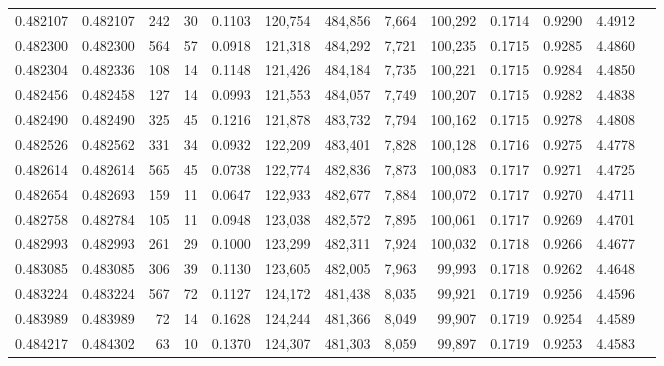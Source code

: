 \begin{tabular}{rrrrrrrrrrrrr}
0.482107 & 0.482107 &   242 &    30 &                                     0.1103 & 120,754 & 484,856 &   7,664 & 100,292 & 0.1714 & 0.9290 & 4.4912 \\
0.482300 & 0.482300 &   564 &    57 &                                     0.0918 & 121,318 & 484,292 &   7,721 & 100,235 & 0.1715 & 0.9285 & 4.4860 \\
0.482304 & 0.482336 &   108 &    14 &                                     0.1148 & 121,426 & 484,184 &   7,735 & 100,221 & 0.1715 & 0.9284 & 4.4850 \\
0.482456 & 0.482458 &   127 &    14 &                                     0.0993 & 121,553 & 484,057 &   7,749 & 100,207 & 0.1715 & 0.9282 & 4.4838 \\
0.482490 & 0.482490 &   325 &    45 &                                     0.1216 & 121,878 & 483,732 &   7,794 & 100,162 & 0.1715 & 0.9278 & 4.4808 \\
0.482526 & 0.482562 &   331 &    34 &                                     0.0932 & 122,209 & 483,401 &   7,828 & 100,128 & 0.1716 & 0.9275 & 4.4778 \\
0.482614 & 0.482614 &   565 &    45 &                                     0.0738 & 122,774 & 482,836 &   7,873 & 100,083 & 0.1717 & 0.9271 & 4.4725 \\
0.482654 & 0.482693 &   159 &    11 &                                     0.0647 & 122,933 & 482,677 &   7,884 & 100,072 & 0.1717 & 0.9270 & 4.4711 \\
0.482758 & 0.482784 &   105 &    11 &                                     0.0948 & 123,038 & 482,572 &   7,895 & 100,061 & 0.1717 & 0.9269 & 4.4701 \\
0.482993 & 0.482993 &   261 &    29 &                                     0.1000 & 123,299 & 482,311 &   7,924 & 100,032 & 0.1718 & 0.9266 & 4.4677 \\
0.483085 & 0.483085 &   306 &    39 &                                     0.1130 & 123,605 & 482,005 &   7,963 &  99,993 & 0.1718 & 0.9262 & 4.4648 \\
0.483224 & 0.483224 &   567 &    72 &                                     0.1127 & 124,172 & 481,438 &   8,035 &  99,921 & 0.1719 & 0.9256 & 4.4596 \\
0.483989 & 0.483989 &    72 &    14 &                                     0.1628 & 124,244 & 481,366 &   8,049 &  99,907 & 0.1719 & 0.9254 & 4.4589 \\
0.484217 & 0.484302 &    63 &    10 &                                     0.1370 & 124,307 & 481,303 &   8,059 &  99,897 & 0.1719 & 0.9253 & 4.4583 \\

\end{tabular}
